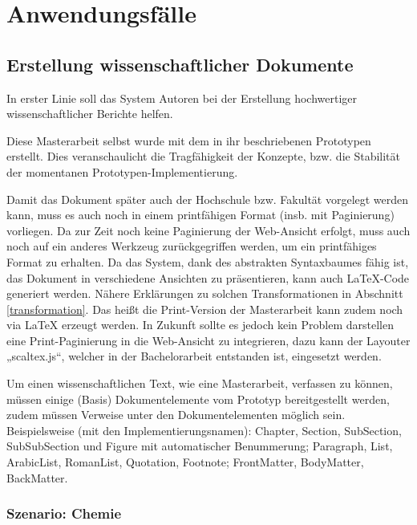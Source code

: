  
\chapter{Anwendungsfälle}\label{}
 
\section{Erstellung wissenschaftlicher Dokumente}\label{wiss-dok-abschnitt}
 
In erster Linie soll das System Autoren bei der Erstellung hochwertiger wissenschaftlicher Berichte helfen.

 
Diese Masterarbeit selbst wurde mit dem in ihr beschriebenen Prototypen erstellt. Dies veranschaulicht die Tragfähigkeit der Konzepte, bzw. die Stabilität der momentanen Prototypen-Implementierung.

 
Damit das Dokument später auch der Hochschule bzw. Fakultät vorgelegt werden kann, muss es auch noch in einem printfähigen Format (insb. mit Paginierung) vorliegen.  Da zur Zeit noch keine Paginierung der Web-Ansicht erfolgt, muss auch noch auf ein anderes Werkzeug zurückgegriffen werden, um ein printfähiges Format zu erhalten. Da das System, dank des abstrakten Syntaxbaumes fähig ist, das Dokument in verschiedene Ansichten zu präsentieren, kann auch LaTeX-Code generiert werden.  Nähere Erklärungen zu solchen Transformationen in Abschnitt \ref{transformation}. Das heißt die Print-Version der Masterarbeit kann zudem noch via LaTeX erzeugt werden. In Zukunft sollte es jedoch kein Problem darstellen eine Print-Paginierung in die Web-Ansicht zu integrieren, dazu kann der Layouter „scaltex.js“, welcher in der Bachelorarbeit \citep{Hodapp} entstanden ist, eingesetzt werden.

 
Um einen wissenschaftlichen Text, wie eine Masterarbeit, verfassen zu können, müssen einige (Basis) Dokumentelemente vom Prototyp bereitgestellt werden, zudem müssen Verweise unter den Dokumentelementen möglich sein. Beispielsweise (mit den Implementierungsnamen): Chapter, Section, SubSection, SubSubSection und Figure mit automatischer Benummerung; Paragraph, List, ArabicList, RomanList, Quotation, Footnote; FrontMatter, BodyMatter, BackMatter.

 
\subsection{Szenario: Chemie}\label{chemie-szenario}
 
